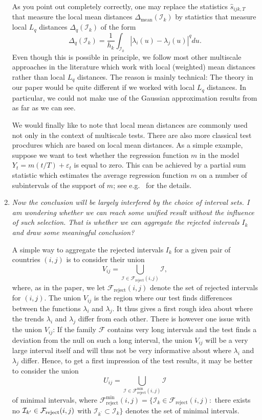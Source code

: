 \documentclass[a4paper,12pt]{article}
\begin{document}
\begin{enumerate}[label=(\arabic*),leftmargin=0.7cm]
As you point out completely correctly, one may replace the statistics $\hat{s}_{ijk,T}$ that measure the local mean distances $\Delta_{\text{mean}}(\mathcal{I}_k)$ by statistics that measure local $L_q$ distances $\Delta_q(\mathcal{I}_k)$ of the form 
\[ \Delta_q(\mathcal{I}_k) = \frac{1}{h_k} \int_{\mathcal{I}_k} |\lambda_i(u) - \lambda_j(u)|^q du. \]
Even though this is possible in principle, we follow most other multiscale approaches in the literature which work with local (weighted) mean distances rather than local $L_q$ distances. The reason is mainly technical: The theory in our paper would be quite different if we worked with local $L_q$ distances. In particular, we could not make use of the Gaussian approximation results from \cite{Chernozhukov2017} as far as we can see. 

We would finally like to note that local mean distances are commonly used not only in the context of multiscale tests. There are also more classical test procdures which are based on local mean distances. As a simple example, suppose we want to test whether the regression function $m$ in the model $Y_t = m(t/T) + \varepsilon_t$ is equal to zero. This can be achieved by a partial sum statistic which estimates the average regression function $m$ on a number of subintervals of the support of $m$; see e.g.\ \cite{Stute1997} for the details. 


\item \textit{Now the conclusion will be largely interfered by the choice of interval sets. I am wondering whether we can reach some unified result without the influence of such selection. That is whether we can aggregate the rejected intervals $I_k$ and draw some meaningful conclusion?}

A simple way to aggregate the rejected intervals $I_k$ for a given pair of countries $(i,j)$ is to consider their union
\[ V_{ij} = \bigcup_{\mathcal{I} \in \mathcal{F}_{\text{reject}}(i,j)} \mathcal{I}, \]
where, as in the paper, we let $\mathcal{F}_{\text{reject}}(i,j)$ denote the set of rejected intervals for $(i,j)$. The union $V_{ij}$ is the region where our test finds differences between the functions $\lambda_i$ and $\lambda_j$. It thus gives a first rough idea about where the trends $\lambda_i$ and $\lambda_j$ differ from each other. There is however one issue with the union $V_{ij}$: If the family $\mathcal{F}$ contains very long intervals and the test finds a deviation from the null on such a long interval, the union $V_{ij}$ will be a very large interval itself and will thus not be very informative about where $\lambda_i$ and $\lambda_j$ differ. Hence, to get a first impression of the test results, it may be better to consider the union 
\[ U_{ij} = \bigcup_{\mathcal{I} \in \mathcal{F}_{\text{reject}}^{\min}(i,j)} \mathcal{I} \]
of minimal intervals, where $\mathcal{F}_{\text{reject}}^{\text{min}}(i,j) = \{ \mathcal{I}_k \in \mathcal{F}_{\text{reject}}(i,j):$  there exists no $\mathcal{I}_{k^\prime} \in \mathcal{F}_{\text{reject}}(i,j)$ with $\mathcal{I}_{k^\prime} \subset \mathcal{I}_k \}$ denotes the set of minimal intervals. 


\end{enumerate}
\end{document}

